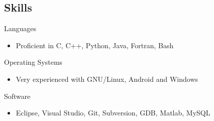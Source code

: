 \documentclass[margin,line]{res}
\begin{document}
\begin{resume}
    \section{\sc Skills} 

      {Languages}
      \begin{itemize} \itemsep -2pt
        \item Proficient in C, C++, Python, Java, Fortran, Bash
      \end{itemize}
      
      \vspace{-.3cm}
      
      {Operating Systems}
      \begin{itemize} \itemsep -2pt
        \item Very experienced with GNU/Linux, Android and Windows
      \end{itemize}
      
      \vspace{-.3cm}

      {Software}
      \begin{itemize} \itemsep -2pt
        \item Eclipse, Visual Studio, Git, Subversion, GDB, Matlab, MySQL
      \end{itemize}



\end{resume}
\end{document}
